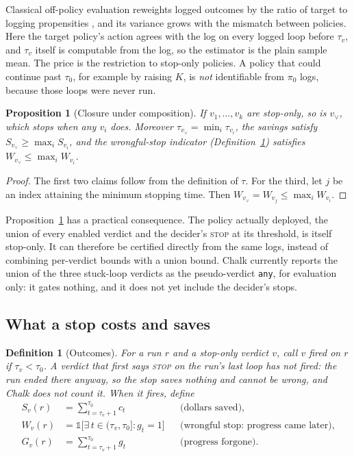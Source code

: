 \documentclass[11pt]{article}
\newtheorem{definition}{Definition}
\newtheorem{proposition}{Proposition}
\theoremstyle{remark}
\begin{document}
Classical off-policy evaluation reweights logged outcomes by the ratio of target to logging propensities \citep{dudik2011doubly,bottou2013counterfactual}, and its variance grows with the mismatch between policies. Here the target policy's action agrees with the log on every logged loop before $\tau_v$, and $\tau_v$ itself is computable from the log, so the estimator is the plain sample mean. The price is the restriction to stop-only policies. A policy that could continue past $\tau_0$, for example by raising $K$, is \emph{not} identifiable from $\pi_0$ logs, because those loops were never run.

\begin{proposition}[Closure under composition]
\label{prop:union}
If $v_1,\dots,v_k$ are stop-only, so is $v_\vee$, which stops when any $v_i$ does. Moreover $\tau_{v_\vee}=\min_i\tau_{v_i}$, the savings satisfy $S_{v_\vee}\ge\max_i S_{v_i}$, and the wrongful-stop indicator (Definition~\ref{def:outcomes}) satisfies $W_{v_\vee}\le\max_i W_{v_i}$.
\end{proposition}

\begin{proof}
The first two claims follow from the definition of $\tau$. For the third, let $j$ be an index attaining the minimum stopping time. Then $W_{v_\vee}=W_{v_j}\le\max_i W_{v_i}$.
\end{proof}

Proposition~\ref{prop:union} has a practical consequence. The policy actually deployed, the union of every enabled verdict and the decider's \textup{\textsc{stop}} at its threshold, is itself stop-only. It can therefore be certified directly from the same logs, instead of combining per-verdict bounds with a union bound. Chalk currently reports the union of the three stuck-loop verdicts as the pseudo-verdict \texttt{any}, for evaluation only: it gates nothing, and it does not yet include the decider's stops.

\subsection{What a stop costs and saves}

\begin{definition}[Outcomes]
\label{def:outcomes}
For a run $r$ and a stop-only verdict $v$, call $v$ \emph{fired} on $r$ if $\tau_v<\tau_0$. A verdict that first says \textsc{stop} on the run's last loop has not fired: the run ended there anyway, so the stop saves nothing and cannot be wrong, and Chalk does not count it. When it fires, define
\begin{align*}
S_v(r) &= \textstyle\sum_{t=\tau_v+1}^{\tau_0} c_t && \text{(dollars saved)},\\
W_v(r) &= \mathbb{1}\bigl[\exists\, t\in(\tau_v,\tau_0]: g_t=1\bigr] && \text{(wrongful stop: progress came later)},\\
G_v(r) &= \textstyle\sum_{t=\tau_v+1}^{\tau_0} g_t && \text{(progress forgone)}.
\end{align*}
\end{definition}
\end{document}
